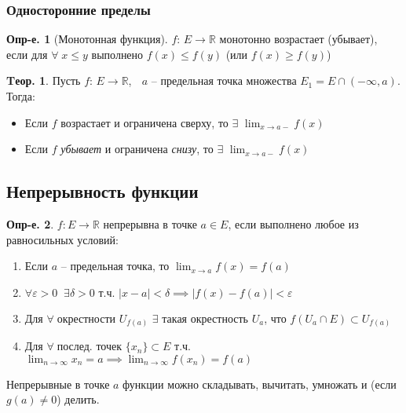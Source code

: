 \documentclass[a4paper,12pt]{article}
\numberwithin{figure}{section}
\theoremstyle{definition}
\newtheorem{definition}{Опр-е.}[section]
\theoremstyle{definition}
\newtheorem{theorem}{Tеор.}[section]
\def\.{\;\;}
\def\eps{\varepsilon}
\def\ntoinf{n \to \infty}
\def\mathR{\mathbb{R}}
\def\leqs{\leqslant}
\def\geqs{\geqslant}
\def\any {$\forall\;$}
\begin{document}
\subsubsection{Односторонние пределы}

\begin{definition}[Монотонная функция]
	$f :\, E\to\mathR$ монотонно возрастает (убывает), если для \any $x \leqs y$
	выполнено $f(x) \leqs f(y)$ (или $f(x) \geqs f(y)$)
\end{definition}


\begin{theorem}
	Пусть $f:\, E\to\mathR$, $\;$ $a$ -- предельная точка множества $E_1=E \cap (-\infty,a)$.
	Тогда: \begin{itemize}
		\item Если $f$ возрастает и ограничена сверху, то
			  $\exists$ $\displaystyle \lim_{x\to a-}f(x)$
		\item Если $f$ \textit{убывает} и ограничена \textit{снизу}, то
			  $\exists$ $\displaystyle \lim_{x\to a-}f(x)$
	\end{itemize}
\end{theorem}


\subsection{Непрерывность функции}

\begin{definition}
  $f\!: E\to\mathR$ непрерывна в точке $a \in E$,
  если выполнено любое из равносильных условий:
  \begin{enumerate}
	\item Если $a$ -- предельная точка, то $\displaystyle \lim_{x\to a}f(x)=f(a)$
	\item $\displaystyle \forall\eps>0 \. \exists\delta>0 \text{ т.ч. }
		   |x-a|<\delta \implies |f(x)-f(a)|<\eps$
	\item Для \any окрестности $U_{f(a)}$ $\exists$ такая окрестность $U_a$,
		  что $f(U_a \cap E) \subset U_{f(a)}$
	\item Для \any послед. точек $\{x_n\} \subset E$ т.ч.
		  $\displaystyle \lim_{\ntoinf}x_n=a \implies \lim_{\ntoinf}f(x_n)=f(a)$
  \end{enumerate}
\end{definition}

Непрерывные в точке $a$ функции можно складывать, вычитать, умножать и (если $g(a)\ne0$) делить.
\end{document}
